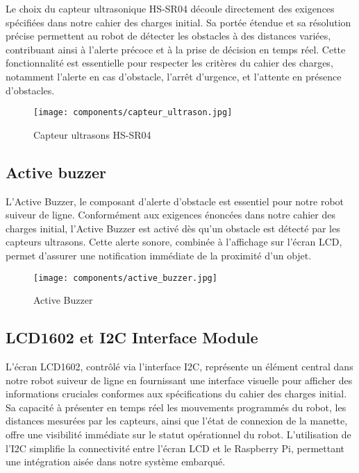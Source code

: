 Le choix du capteur ultrasonique HS-SR04 découle directement des exigences spécifiées dans notre cahier des charges initial. Sa portée étendue et sa résolution précise permettent au robot de détecter les obstacles à des distances variées, contribuant ainsi à l'alerte précoce et à la prise de décision en temps réel. Cette fonctionnalité est essentielle pour respecter les critères du cahier des charges, notamment l'alerte en cas d'obstacle, l'arrêt d'urgence, et l'attente en présence d'obstacles.

\begin{figure}[h]
    \centering
    \texttt{[image: components/capteur\_ultrason.jpg]}
    \caption{Capteur ultrasons HS-SR04}
    \label{fig:HS-SR04}
\end{figure}

\subsection{Active buzzer}
L'Active Buzzer, le composant d'alerte d'obstacle est essentiel pour notre robot suiveur de ligne. Conformément aux exigences énoncées dans notre cahier des charges initial, l'Active Buzzer est activé dès qu'un obstacle est détecté par les capteurs ultrasons. Cette alerte sonore, combinée à l'affichage sur l'écran LCD, permet d'assurer une notification immédiate de la proximité d'un objet.

\begin{figure}[h]
    \centering
    \texttt{[image: components/active\_buzzer.jpg]}
    \caption{Active Buzzer}
    \label{fig:Active Buzzer}
\end{figure}

\subsection{LCD1602 et I2C Interface Module}
L'écran LCD1602, contrôlé via l'interface I2C, représente un élément central dans notre robot suiveur de ligne en fournissant une interface visuelle pour afficher des informations cruciales conformes aux spécifications du cahier des charges initial. Sa capacité à présenter en temps réel les mouvements programmés du robot, les distances mesurées par les capteurs, ainsi que l'état de connexion de la manette, offre une visibilité immédiate sur le statut opérationnel du robot. L'utilisation de l'I2C simplifie la connectivité entre l'écran LCD et le Raspberry Pi, permettant une intégration aisée dans notre système embarqué.

